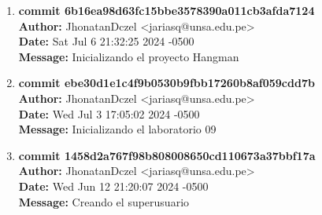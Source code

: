 \begin{enumerate}
    \item \textbf{commit 6b16ea98d63fc15bbe3578390a011cb3afda7124} \\
    \textbf{Author:} JhonatanDczel <jariasq@unsa.edu.pe> \\
    \textbf{Date:} Sat Jul 6 21:32:25 2024 -0500 \\
    \textbf{Message:} Inicializando el proyecto Hangman

    \item \textbf{commit ebe30d1e1c4f9b0530b9fbb17260b8af059cdd7b} \\
    \textbf{Author:} JhonatanDczel <jariasq@unsa.edu.pe> \\
    \textbf{Date:} Wed Jul 3 17:05:02 2024 -0500 \\
    \textbf{Message:} Inicializando el laboratorio 09

    \item \textbf{commit 1458d2a767f98b808008650cd110673a37bbf17a} \\
    \textbf{Author:} JhonatanDczel <jariasq@unsa.edu.pe> \\
    \textbf{Date:} Wed Jun 12 21:20:07 2024 -0500 \\
    \textbf{Message:} Creando el superusuario
\end{enumerate}
